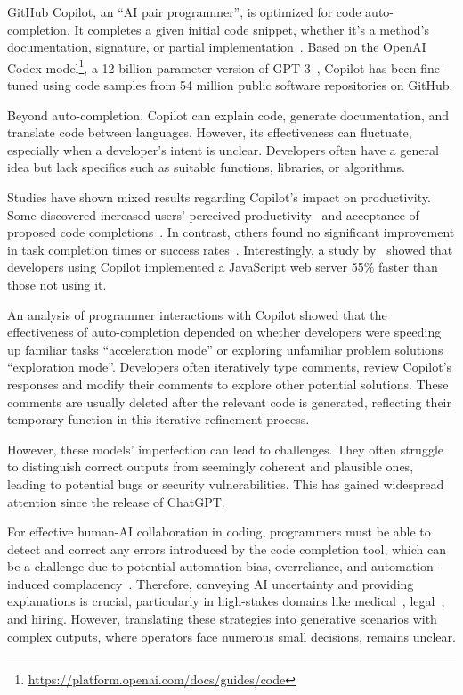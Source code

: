 GitHub Copilot, an ``AI pair programmer'', is optimized for code auto-completion. It completes a given initial code snippet, whether it's a method's documentation, signature, or partial implementation~\cite{MarkChen2021}. Based on the OpenAI Codex model\footnote{\url{https://platform.openai.com/docs/guides/code}}, a 12 billion parameter version of GPT-3~\cite{Brown2020}, Copilot has been fine-tuned using code samples from 54 million public software repositories on GitHub.

Beyond auto-completion, Copilot can explain code, generate documentation, and translate code between languages. However, its effectiveness can fluctuate, especially when a developer's intent is unclear. Developers often have a general idea but lack specifics such as suitable functions, libraries, or algorithms.

Studies have shown mixed results regarding Copilot's impact on productivity. Some discovered increased users' perceived productivity~\cite{Ziegler2022productivity} and acceptance of proposed code completions~\cite{Vaithilingam2022}. In contrast, others found no significant improvement in task completion times or success rates~\cite{Vaithilingam2022}. Interestingly, a study by~\cite{Ziegler2022productivity} showed that developers using Copilot implemented a JavaScript web server 55\% faster than those not using it.

An analysis of programmer interactions with Copilot showed that the effectiveness of auto-completion depended on whether developers were speeding up familiar tasks ``acceleration mode'' or exploring unfamiliar problem solutions ``exploration mode''. Developers often iteratively type comments, review Copilot's responses and modify their comments to explore other potential solutions. These comments are usually deleted after the relevant code is generated, reflecting their temporary function in this iterative refinement process.

However, these models' imperfection can lead to challenges. They often struggle to distinguish correct outputs from seemingly coherent and plausible ones, leading to potential bugs or security vulnerabilities. This has gained widespread attention since the release of ChatGPT.

For effective human-AI collaboration in coding, programmers must be able to detect and correct any errors introduced by the code completion tool, which can be a challenge due to potential automation bias, overreliance, and automation-induced complacency~\cite{Wickens2015}. Therefore, conveying AI uncertainty and providing explanations is crucial, particularly in high-stakes domains like medical~\cite{Lundberg2018}, legal~\cite{Pagliario2022}, and hiring. However, translating these strategies into generative scenarios with complex outputs, where operators face numerous small decisions, remains unclear.



